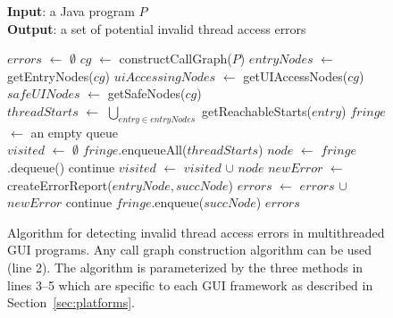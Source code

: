 \begin{figure}[t]
\textbf{Input}: a Java program $\mathit{P}$\\
\textbf{Output}: a set of potential invalid thread access errors\\
\vspace{-4mm}
\begin{algorithmic}[1]
\STATE $\mathit{errors}$ $\leftarrow$ $\emptyset$ 
\STATE $\mathit{cg}$ $\leftarrow$ constructCallGraph($\mathit{P}$)
\STATE $\mathit{entryNodes}$ $\leftarrow$ getEntryNodes($\mathit{cg}$)
\STATE $\mathit{uiAccessingNodes}$ $\leftarrow$ getUIAccessNodes($\mathit{cg}$)
\STATE $\mathit{safeUINodes}$ $\leftarrow$ getSafeNodes($\mathit{cg}$)\\
\STATE $\mathit{threadStarts}$ $\leftarrow$ $\bigcup_{entry \in entryNodes}$ getReachableStarts($\mathit{entry}$)
\STATE $\mathit{fringe}$ $\leftarrow$ an empty queue\\
\STATE $\mathit{visited}$ $\leftarrow$ $\emptyset$
\STATE $\mathit{fringe}$.enqueueAll($\mathit{threadStarts}$)
\STATE $\mathit{node}$ $\leftarrow$ $\mathit{fringe}$.dequeue()
\STATE continue
\ENDIF
\STATE $\mathit{visited}$ $\leftarrow$ $\mathit{visited}$ $\cup$ $\mathit{node}$
\STATE $\mathit{newError}$ $\leftarrow$ createErrorReport($\mathit{entryNode, succNode}$)
\STATE $\mathit{errors}$ $\leftarrow$ $\mathit{errors}$ $\cup$ $\mathit{newError}$
\STATE continue
\ELSE
\STATE $\mathit{fringe}$.enqueue($\mathit{succNode}$)
\ENDIF 
\ENDFOR
\ENDWHILE
\RETURN $errors$
\vspace{-2mm}
\end{algorithmic}
\caption{Algorithm for detecting invalid thread access errors in multithreaded GUI programs. 
Any call graph construction algorithm can be used (line 2). The algorithm
is parameterized by the three methods in lines 3--5 which are specific to each GUI framework
 as described in Section~\ref{sec:platforms}.
} \label{fig:detectalgorithm}
\end{figure}

